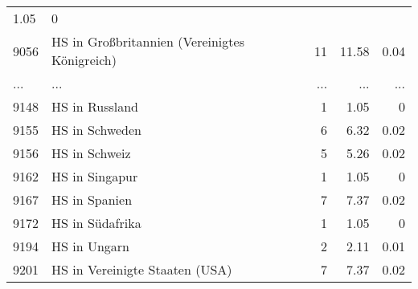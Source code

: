 \begin{longtable}{lXrrr}
          \num[round-mode=places,round-precision=2]{1.05} &
          \num[round-mode=places,round-precision=2]{0} \\
        9056 & \multicolumn{1}{X}{HS in Großbritannien (Vereinigtes Königreich)} & %
          \num{11} &
          \num[round-mode=places,round-precision=2]{11.58} &
          \num[round-mode=places,round-precision=2]{0.04} \\
       ... & ... & ... & ... & ... \\
        9148 & \multicolumn{1}{X}{HS in Russland} & %
          \num{1} &
          \num[round-mode=places,round-precision=2]{1.05} &
          \num[round-mode=places,round-precision=2]{0} \\

        9155 & \multicolumn{1}{X}{HS in Schweden} & %
          \num{6} &
          \num[round-mode=places,round-precision=2]{6.32} &
          \num[round-mode=places,round-precision=2]{0.02} \\

        9156 & \multicolumn{1}{X}{HS in Schweiz} & %
          \num{5} &
          \num[round-mode=places,round-precision=2]{5.26} &
          \num[round-mode=places,round-precision=2]{0.02} \\

        9162 & \multicolumn{1}{X}{HS in Singapur} & %
          \num{1} &
          \num[round-mode=places,round-precision=2]{1.05} &
          \num[round-mode=places,round-precision=2]{0} \\

        9167 & \multicolumn{1}{X}{HS in Spanien} & %
          \num{7} &
          \num[round-mode=places,round-precision=2]{7.37} &
          \num[round-mode=places,round-precision=2]{0.02} \\

        9172 & \multicolumn{1}{X}{HS in Südafrika} & %
          \num{1} &
          \num[round-mode=places,round-precision=2]{1.05} &
          \num[round-mode=places,round-precision=2]{0} \\

        9194 & \multicolumn{1}{X}{HS in Ungarn} & %
          \num{2} &
          \num[round-mode=places,round-precision=2]{2.11} &
          \num[round-mode=places,round-precision=2]{0.01} \\

        9201 & \multicolumn{1}{X}{HS in Vereinigte Staaten (USA)} & %
          \num{7} &
          \num[round-mode=places,round-precision=2]{7.37} &
          \num[round-mode=places,round-precision=2]{0.02} \\


\end{longtable}
